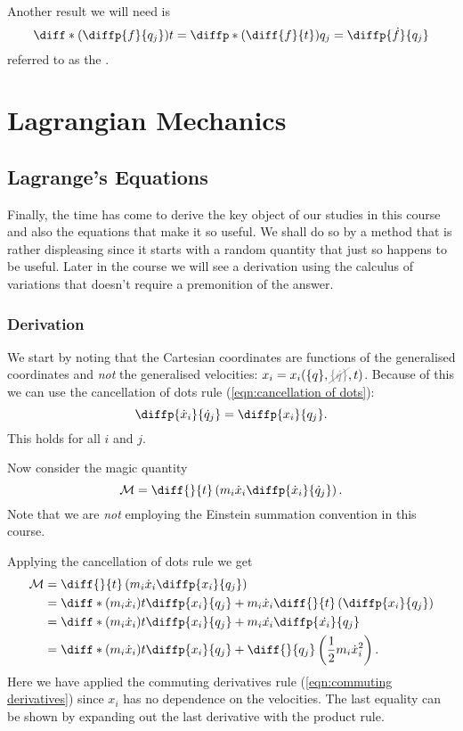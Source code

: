 \documentclass[fleqn]{NotesClass}
\newcommand*{\nodependence}[1]{\textcolor{gray}{\cancel{#1}}}
\begin{document}
    Another result we will need is
    \begin{equation}\label{eqn:commuting derivatives}
        \diff*{\left( \diffp{f}{q_j} \right)}{t} = \diffp*{\left( \diff{f}{t} \right)}{q_j} = \diffp{\dot{f}}{q_j}
    \end{equation}
    referred to as the .
    
    
    \part{Lagrangian Mechanics}
    \chapter{Lagrange's Equations}
    Finally, the time has come to derive the key object of our studies in this course and also the equations that make it so useful.
    We shall do so by a method that is rather displeasing since it starts with a random quantity that just so happens to be useful.
    Later in the course we will see a derivation using the calculus of variations that doesn't require a premonition of the answer.
    
    \section{Derivation}
    We start by noting that the Cartesian coordinates are functions of the generalised coordinates and \emph{not} the generalised velocities: \(x_i = x_i(\{q\}, \nodependence{\{\dot{q}\}}, t)\).
    Because of this we can use the cancellation of dots rule (\cref{eqn:cancellation of dots}):
    \begin{equation}
        \diffp{\dot{x}_i}{\dot{q}_j} = \diffp{x_i}{q_j}.
    \end{equation}
    This holds for all \(i\) and \(j\).
    
    Now consider the magic quantity
    \begin{equation}
        \mathcal{M} = \diff{}{t}\left( m_i\dot{x}_i \diffp{\dot{x}_i}{\dot{q}_j} \right).
    \end{equation}
    Note that we are \emph{not} employing the Einstein summation convention in this course.
    
    Applying the cancellation of dots rule we get
    \begin{align}
        \mathcal{M} &= \diff{}{t} \left( m_i\dot{x}_i \diffp{x_i}{q_j} \right)\\
        &= \diff*{(m_i\dot{x}_i)}{t}\diffp{x_i}{q_j} + m_i\dot{x}_i\diff{}{t}\left( \diffp{x_i}{q_j} \right)\\
        &= \diff*{(m_i\dot{x}_i)}{t}\diffp{x_i}{q_j} + m_i\dot{x_i}\diffp{\dot{x_i}}{q_j}\\
        &= \diff*{(m_i\dot{x}_i)}{t}\diffp{x_i}{q_j} + \diff{}{q_j}\left( \frac{1}{2}m_i\dot{x}_i^2 \right).
    \end{align}
    Here we have applied the commuting derivatives rule (\cref{eqn:commuting derivatives}) since \(x_i\) has no dependence on the velocities.
    The last equality can be shown by expanding out the last derivative with the product rule.
    
\end{document}
